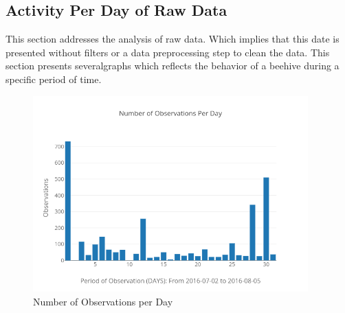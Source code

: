 \documentclass[11pt,fleqn]{book} %
\begin{document}
\subsection{Activity Per Day of Raw Data}%
\label{subsec:Activity Per Day of Raw Data}%
This section addresses the analysis of raw data. Which implies that this date is presented without filters or a data preprocessing step to clean the data. This section presents severalgraphs which reflects the behavior of a beehive during a specific period of time.%


\begin{figure}[h!]%
\centering%
\includegraphics[width=400px]{Pictures/Morelia Hive 1observationsPerdayUnclean.png}%
\caption{Number of Observations per Day}%
\end{figure}
\end{document}
